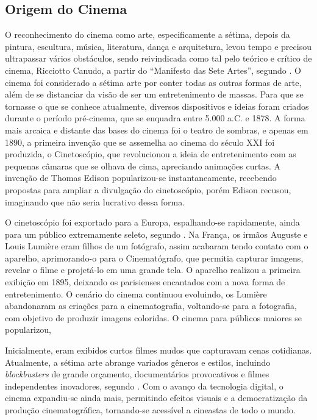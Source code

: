 \documentclass[
	article,			%
	12pt,				%
	oneside,			%
	a4paper,			%
	english,			%
	brazil,				%
	sumario=tradicional
	]{abntex2}
\begin{document}
\subsection{Origem do Cinema}

O reconhecimento do cinema como arte, especificamente a sétima, depois da pintura, escultura, música, literatura, dança e arquitetura, levou tempo e precisou ultrapassar vários obstáculos, sendo reivindicada como tal pelo teórico e crítico de cinema, Ricciotto Canudo, a partir do “Manifesto das Sete Artes”, segundo . O cinema foi considerado a sétima arte por conter todas as outras formas de arte, além de se distanciar da visão de ser um entretenimento de massas. Para que se tornasse o que se conhece atualmente, diversos dispositivos e ideias foram criados durante o período pré-cinema, que se enquadra entre 5.000 a.C. e 1878. A forma mais arcaica e distante das bases do cinema foi o teatro de sombras, e apenas em 1890, a primeira invenção que se assemelha ao cinema do século XXI foi produzida, o Cinetoscópio, que revolucionou a ideia de entretenimento com as pequenas câmaras que se olhava de cima, apreciando animações curtas. A invenção de Thomas Edison popularizou-se instantaneamente, recebendo propostas para ampliar a divulgação do cinetoscópio, porém Edison recusou, imaginando que não seria lucrativo dessa forma.

O cinetoscópio foi exportado para a Europa, espalhando-se rapidamente, ainda para um público extremamente seleto, segundo . Na França, os irmãos Auguste e Louis Lumière eram filhos de um fotógrafo, assim acabaram tendo contato com o aparelho, aprimorando-o para o Cinematógrafo, que permitia capturar imagens, revelar o filme e projetá-lo em uma grande tela. O aparelho realizou a primeira exibição em 1895, deixando os parisienses encantados com a nova forma de entretenimento. O cenário do cinema continuou evoluindo, os Lumière abandonaram as criações para a cinematografia, voltando-se para a fotografia, com objetivo de produzir imagens coloridas. O cinema para públicos maiores se popularizou, 

Inicialmente, eram exibidos curtos filmes mudos que capturavam cenas cotidianas. Atualmente, a sétima arte abrange variados gêneros e estilos, incluindo \textit{blockbusters} de grande orçamento, documentários provocativos e filmes independentes inovadores, segundo . Com o avanço da tecnologia digital, o cinema expandiu-se ainda mais, permitindo efeitos visuais e a democratização da produção cinematográfica, tornando-se acessível a cineastas de todo o mundo.
 
\end{document}
